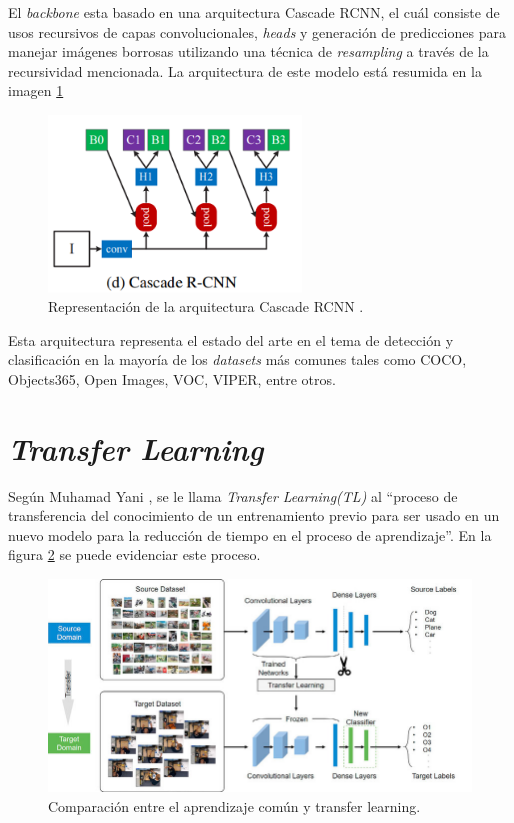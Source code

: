 El \textit{backbone} esta basado en una arquitectura Cascade RCNN, el cuál consiste de usos recursivos de capas convolucionales, \textit{heads} y generación de predicciones para manejar imágenes borrosas utilizando una técnica de \textit{resampling} a través de la recursividad mencionada. La arquitectura de este modelo está resumida en la imagen \ref{fig:cascade}

\begin{figure}[h!]
\includegraphics[width=0.6\textwidth]{images/cascadercnn.png}
\centering
\caption{Representación de la arquitectura Cascade RCNN \protect\cite{cascadercnn}.}
\label{fig:cascade}
\end{figure}

Esta arquitectura representa el estado del arte en el tema de detección y clasificación en la 
mayoría de los \textit{datasets} más comunes tales como COCO, Objects365, Open Images, VOC, 
VIPER, entre otros.  

\section{\textit{Transfer Learning}}
Según Muhamad Yani \cite{Yani2019}, se le llama \textit{Transfer Learning(TL)} al ``proceso de  
transferencia del conocimiento de un entrenamiento previo para ser usado en un nuevo modelo para la 
reducción de tiempo en el proceso de aprendizaje''. En la figura \ref{transfer-learning} se 
puede evidenciar este proceso.\\ 

\begin{figure}[h!]
\includegraphics[width=1\textwidth]{images/transfer-learning.png}
\centering
\caption{Comparación entre el aprendizaje común y transfer learning. \protect\cite{transfer-learning}}
\label{transfer-learning}
\end{figure}

